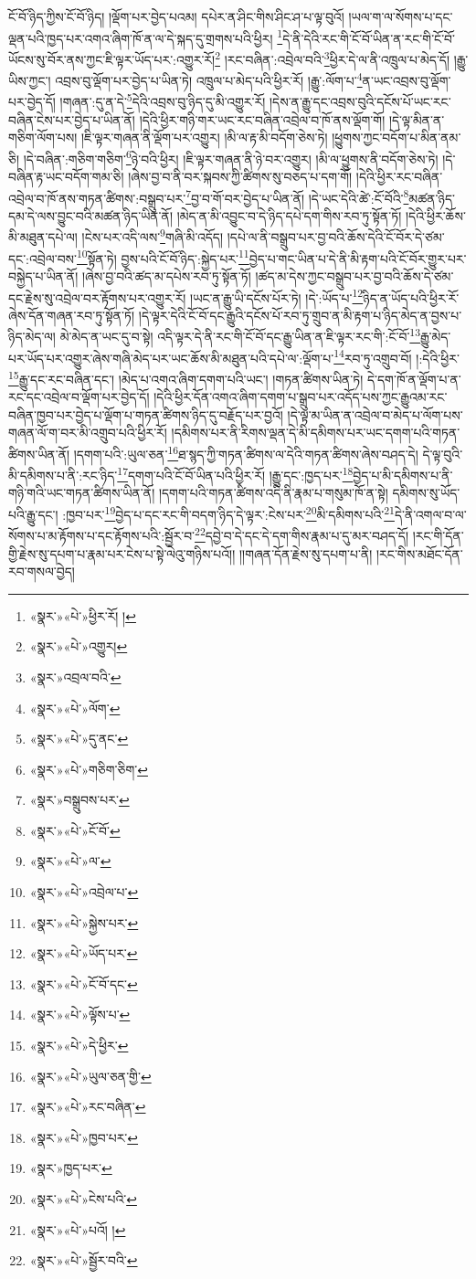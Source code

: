 ངོ་བོ་ཉིད་ཀྱིས་ངོ་བོ་ཉིད། །ལྡོག་པར་བྱེད་པའམ། དཔེར་ན་ཤིང་གིས་ཤིང་ཤ་པ་ལྟ་བུའོ། །ཡལ་ག་ལ་སོགས་པ་དང་ལྡན་པའི་ཁྱད་པར་འགའ་ཞིག་ཁོ་ན་ལ་དེ་སྐད་དུ་གྲགས་པའི་ཕྱིར། \footnote{«སྣར་»«པེ་»ཕྱིར་རོ། ། }དེ་ནི་དེའི་རང་གི་ངོ་བོ་ཡིན་ན་རང་གི་ངོ་བོ་ཡོངས་སུ་བོར་ནས་ཀྱང་ཇི་ལྟར་ཡོད་པར་:འགྱུར་རོ།\footnote{«སྣར་»«པེ་»འགྱུར།} །རང་བཞིན་:འབྲེལ་བའི་\footnote{«སྣར་»འབྲལ་བའི་}ཕྱིར་དེ་ལ་ནི་འཁྲུལ་པ་མེད་དོ། །རྒྱུ་ཡིས་ཀྱང་། འབྲས་བུ་ལྡོག་པར་བྱེད་པ་ཡིན་ཏེ། འཁྲུལ་པ་མེད་པའི་ཕྱིར་རོ། །རྒྱུ་:ལོག་པ་\footnote{«སྣར་»«པེ་»ལོག་}ན་ཡང་འབྲས་བུ་ལྡོག་པར་བྱེད་དོ། །གཞན་:དུ་ན་དེ་\footnote{«སྣར་»«པེ་»དུ་ནང་}དེའི་འབྲས་བུ་ཉིད་དུ་མི་འགྱུར་རོ། །དེས་ན་རྒྱུ་དང་འབྲས་བུའི་དངོས་པོ་ཡང་རང་བཞིན་ངེས་པར་བྱེད་པ་ཡིན་ནོ། །དེའི་ཕྱིར་གཉི་གར་ཡང་རང་བཞིན་འབྲེལ་བ་ཁོ་ནས་ལྡོག་གོ། །དེ་ལྟ་མིན་ན་གཅིག་ལོག་པས། །ཇི་ལྟར་གཞན་ནི་ལྡོག་པར་འགྱུར། །མི་ལ་རྟ་མི་བདོག་ཅེས་ཏེ། །ཕྱུགས་ཀྱང་བདོག་པ་མིན་ནམ་ཅི། །དེ་བཞིན་:གཅིག་གཅིག་\footnote{«སྣར་»«པེ་»གཅིག་ཅིག་}ཉེ་བའི་ཕྱིར། །ཇི་ལྟར་གཞན་ནི་ཉེ་བར་འགྱུར། །མི་ལ་ཕྱུགས་ནི་བདོག་ཅེས་ཏེ། །དེ་བཞིན་རྟ་ཡང་བདོག་གམ་ཅི། །ཞེས་བྱ་བ་ནི་བར་སྐབས་ཀྱི་ཚིགས་སུ་བཅད་པ་དག་གོ། །དེའི་ཕྱིར་རང་བཞིན་འབྲེལ་བ་ཁོ་ནས་གཏན་ཚིགས་:བསྒྲུབ་པར་\footnote{«སྣར་»བསྒྲུབས་པར་}བྱ་བ་གོ་བར་བྱེད་པ་ཡིན་ནོ། །དེ་ཡང་དེའི་ཚེ་:ངོ་བོའི་\footnote{«སྣར་»«པེ་»ངོ་བོ་}མཚན་ཉིད་དམ་དེ་ལས་བྱུང་བའི་མཚན་ཉིད་ཡིན་ནོ། །མེད་ན་མི་འབྱུང་བ་དེ་ཉིད་དཔེ་དག་གིས་རབ་ཏུ་སྟོན་ཏོ། །དེའི་ཕྱིར་ཆོས་མི་མཐུན་དཔེ་ལ། །ངེས་པར་འདི་ལས་\footnote{«སྣར་»«པེ་»ལ་}གཞི་མི་འདོད། །དཔེ་ལ་ནི་བསྒྲུབ་པར་བྱ་བའི་ཆོས་དེའི་ངོ་བོར་དེ་ཙམ་དང་:འབྲེལ་བས་\footnote{«སྣར་»«པེ་»འབྲེལ་པ་}སྟོན་ཏེ། བྱས་པའི་ངོ་བོ་ཉིད་:སྐྱེད་པར་\footnote{«སྣར་»«པེ་»སྐྱེས་པར་}བྱེད་པ་གང་ཡིན་པ་དེ་ནི་མི་རྟག་པའི་ངོ་བོར་གྱུར་པར་བསྐྱེད་པ་ཡིན་ནོ། །ཞེས་བྱ་བའི་ཚད་མ་དཔེས་རབ་ཏུ་སྟོན་ཏོ། །ཚད་མ་དེས་ཀྱང་བསྒྲུབ་པར་བྱ་བའི་ཆོས་དེ་ཙམ་དང་རྗེས་སུ་འབྲེལ་བར་རྟོགས་པར་འགྱུར་རོ། །ཡང་ན་རྒྱུ་ཡི་དངོས་པོར་ཏེ། །དེ་:ཡོད་པ་\footnote{«སྣར་»«པེ་»ཡོད་པར་}ཉིད་ན་ཡོད་པའི་ཕྱིར་རོ་ཞེས་དོན་གཞན་རབ་ཏུ་སྟོན་ཏོ། །དེ་ལྟར་དེའི་ངོ་བོ་དང་རྒྱུའི་དངོས་པོ་རབ་ཏུ་གྲུབ་ན་མི་རྟག་པ་ཉིད་མེད་ན་བྱས་པ་ཉིད་མེད་ལ། མེ་མེད་ན་ཡང་དུ་བ་སྟེ། འདི་ལྟར་དེ་ནི་རང་གི་ངོ་བོ་དང་རྒྱུ་ཡིན་ན་ཇི་ལྟར་རང་གི་:ངོ་བོ་\footnote{«སྣར་»«པེ་»ངོ་བོ་དང་}རྒྱུ་མེད་པར་ཡོད་པར་འགྱུར་ཞེས་གཞི་མེད་པར་ཡང་ཆོས་མི་མཐུན་པའི་དཔེ་ལ་:ལྡོག་པ་\footnote{«སྣར་»«པེ་»ལྟོས་པ་}རབ་ཏུ་འགྲུབ་བོ། །:དེའི་ཕྱིར་\footnote{«སྣར་»«པེ་»དེ་ཕྱིར་}རྒྱུ་དང་རང་བཞིན་དང་། །མེད་པ་འགའ་ཞིག་དགག་པའི་ཡང་། །གཏན་ཚིགས་ཡིན་ཏེ། དེ་དག་ཁོ་ན་ལྡོག་པ་ན་རང་དང་འབྲེལ་བ་ལྡོག་པར་བྱེད་དོ། །དེའི་ཕྱིར་དོན་འགའ་ཞིག་དགག་པ་སྒྲུབ་པར་འདོད་པས་ཀྱང་རྒྱུའམ་རང་བཞིན་ཁྱབ་པར་བྱེད་པ་ལྡོག་པ་གཏན་ཚིགས་ཉིད་དུ་བརྗོད་པར་བྱའོ། །དེ་ལྟ་མ་ཡིན་ན་འབྲེལ་བ་མེད་པ་ལོག་པས་གཞན་ལོ་ག་བར་མི་འགྲུབ་པའི་ཕྱིར་རོ། །དམིགས་པར་ནི་རིགས་ལྡན་དེ་མི་དམིགས་པར་ཡང་དགག་པའི་གཏན་ཚིགས་ཡིན་ནོ། །དགག་པའི་:ཡུལ་ཅན་\footnote{«སྣར་»«པེ་»ཡུལ་ཅན་གྱི་}ཐ་སྙད་ཀྱི་གཏན་ཚིགས་ལ་དེའི་གཏན་ཚིགས་ཞེས་བཤད་དེ། དེ་ལྟ་བུའི་མི་དམིགས་པ་ནི་:རང་ཉིད་\footnote{«སྣར་»«པེ་»རང་བཞིན་}དགག་པའི་ངོ་བོ་ཡིན་པའི་ཕྱིར་རོ། །རྒྱུ་དང་:ཁྱད་པར་\footnote{«སྣར་»«པེ་»ཁྱབ་པར་}བྱེད་པ་མི་དམིགས་པ་ནི་གཉི་གའི་ཡང་གཏན་ཚིགས་ཡིན་ནོ། །དགག་པའི་གཏན་ཚིགས་འདི་ནི་རྣམ་པ་གསུམ་ཁོ་ན་སྟེ། དམིགས་སུ་ཡོད་པའི་རྒྱུ་དང་། :ཁྱབ་པར་\footnote{«སྣར་»ཁྱད་པར་}བྱེད་པ་དང་རང་གི་བདག་ཉིད་དེ་ལྟར་:ངེས་པར་\footnote{«སྣར་»«པེ་»ངེས་པའི་}མི་དམིགས་པའི་\footnote{«སྣར་»«པེ་»པའོ། །}དེ་ནི་འགལ་བ་ལ་སོགས་པ་མ་རྟོགས་པ་དང་རྟོགས་པའི་:སྦྱོར་བ་\footnote{«སྣར་»«པེ་»སྦྱོར་བའི་}དབྱེ་བ་དེ་དང་དེ་དག་གིས་རྣམ་པ་དུ་མར་བཤད་དོ། །རང་གི་དོན་གྱི་རྗེས་སུ་དཔག་པ་རྣམ་པར་ངེས་པ་སྟེ་ལེའུ་གཉིས་པའོ།། །།གཞན་དོན་རྗེས་སུ་དཔག་པ་ནི། །རང་གིས་མཐོང་དོན་རབ་གསལ་བྱེད། 